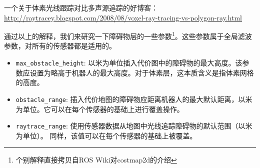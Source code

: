 一个关于体素光线跟踪对比多声源追踪的好博客：
\url{http://raytracey.blogspot.com/2008/08/voxel-ray-tracing-vs-polygon-ray.html} 

通过以上的解释，我们来研究一下障碍物层的一些参数\footnote{个别解释直接拷贝自ROS Wiki对costmap2d的介绍}。这些参数属于全局滤波参数，对所有的传感器都是适用的。

\begin{itemize}
	\item \texttt{max_obstacle_height}: 
	以米为单位插入代价图中的障碍物的最大高度。该参数应设置为略高于机器人的最大高度。对于体素层，这本质含义是指体素网格的高度。
	
	\item \texttt{obstacle_range}: 
	插入代价地图的障碍物应距离机器人的最大默认距离，以米为单位。它可以在每个传感器的基础上进行覆盖操作。
	
	\item \texttt{raytrace_range}: 
	使用传感器数据从地图中光线追踪障碍物的默认范围（以米为单位）。 同样，该值可以在每个传感器的基础上被覆盖。
	
\end{itemize}


